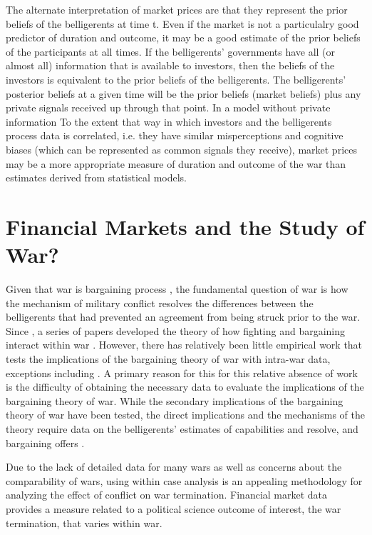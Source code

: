 The alternate interpretation of market prices are that they represent
the prior beliefs of the belligerents at time t. Even if the market is
not a particulalry good predictor of duration and outcome, it may be a
good estimate of the prior beliefs of the participants at all times.
If the belligerents' governments have all (or almost all) information
that is available to investors, then the beliefs of the investors is
equivalent to the prior beliefs of the belligerents. The belligerents'
posterior beliefs at a given time will be the prior beliefs (market
beliefs) plus any private signals received up through that point. In a
model without private information
To the extent that way in which investors and the belligerents process
data is correlated, i.e. they have similar misperceptions and
cognitive biases (which can be represented as common signals they
receive), market prices may be a more appropriate measure of duration
and outcome of the war than estimates derived from statistical models.


\section{Financial Markets and the Study of War?}
\label{bonds_battles:sec:barg-theory-war}

Given that war is bargaining process \parencite{Fearon1995}, the fundamental question of war is how the mechanism of military conflict resolves the differences between the belligerents that had prevented an agreement from being struck prior to the war.
Since \textcite{Fearon1995}, a series of papers developed the theory of how fighting and bargaining interact within war \parencites{FilsonWerner2002}{Slantchev2003}{SmithStam2004}{Powell2004}{LeventogluSlantchev2007}{LangloisLanglois2009}{WolfordReiterCarrubba2011}.
However, there has relatively been little empirical work that tests the implications of the bargaining theory of war with intra-war data, exceptions including \textcites{Goemans2000}{Ramsay2008}{Reiter2009}{Weisiger2013}{Weisiger2015}.
A primary reason for this for this relative absence of work is the difficulty of obtaining the necessary data to evaluate the implications of the bargaining theory of war.
While the secondary implications of the bargaining theory of war have been tested, the direct implications and the mechanisms of the theory require data on the belligerents' estimates of capabilities and resolve, and bargaining offers \parencite[32]{Reiter2003}.

Due to the lack of detailed data for many wars as well as concerns about the comparability of wars, using within case analysis is an appealing methodology for analyzing the effect of conflict on war termination.
Financial market data provides a measure related to a political science outcome of interest, the war termination, that varies within war.

